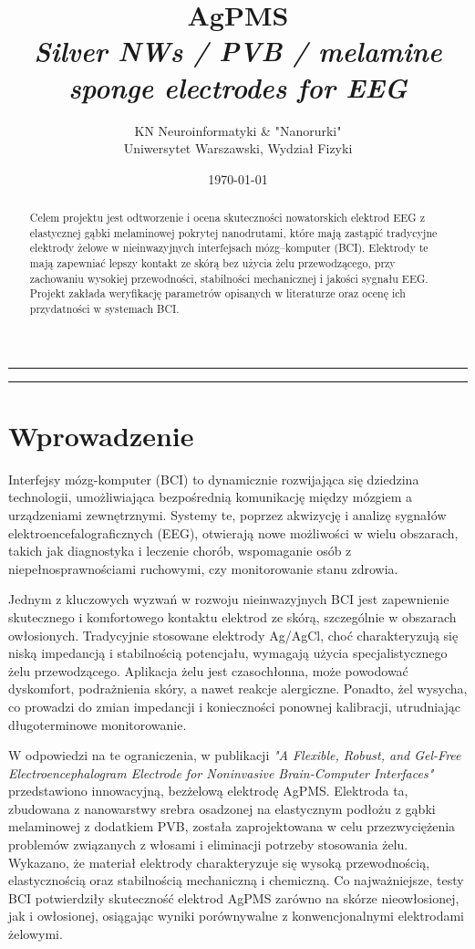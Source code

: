 \documentclass[12pt,a4paper]{article}
\title{\textbf{AgPMS}\\ \large \emph{Silver NWs / PVB / melamine sponge electrodes for EEG}}
\author{KN Neuroinformatyki \& "Nanorurki" \\
\small Uniwersytet Warszawski, Wydział Fizyki}
\date{\today}
\begin{document}
\maketitle
\hrule
\vspace{1em}

\begin{abstract}
    \noindent
    Celem projektu jest odtworzenie i ocena skuteczności nowatorskich elektrod EEG z elastycznej gąbki melaminowej pokrytej nanodrutami, które mają zastąpić tradycyjne elektrody żelowe w nieinwazyjnych interfejsach mózg–komputer (BCI). Elektrody te mają zapewniać lepszy kontakt ze skórą bez użycia żelu przewodzącego, przy zachowaniu wysokiej przewodności, stabilności mechanicznej i jakości sygnału EEG. Projekt zakłada weryfikację parametrów opisanych w literaturze oraz ocenę ich przydatności w systemach BCI.
\end{abstract}

\vspace{1em}
\hrule
\vspace{1em}


\section{Wprowadzenie}
Interfejsy mózg-komputer (BCI) to dynamicznie rozwijająca się dziedzina technologii, umożliwiająca bezpośrednią komunikację między mózgiem a urządzeniami zewnętrznymi. Systemy te, poprzez akwizycję i analizę sygnałów elektroencefalograficznych (EEG), otwierają nowe możliwości w wielu obszarach, takich jak diagnostyka i leczenie chorób, wspomaganie osób z niepełnosprawnościami ruchowymi, czy monitorowanie stanu zdrowia.

Jednym z kluczowych wyzwań w rozwoju nieinwazyjnych BCI jest zapewnienie skutecznego i komfortowego kontaktu elektrod ze skórą, szczególnie w obszarach owłosionych. Tradycyjnie stosowane elektrody Ag/AgCl, choć charakteryzują się niską impedancją i stabilnością potencjału, wymagają użycia specjalistycznego żelu przewodzącego. Aplikacja żelu jest czasochłonna, może powodować dyskomfort, podrażnienia skóry, a nawet reakcje alergiczne. Ponadto, żel wysycha, co prowadzi do zmian impedancji i konieczności ponownej kalibracji, utrudniając długoterminowe monitorowanie.

W odpowiedzi na te ograniczenia, w publikacji \emph{"A Flexible, Robust, and Gel-Free Electroencephalogram Electrode for Noninvasive Brain-Computer Interfaces"} \cite{main} przedstawiono innowacyjną, bezżelową elektrodę AgPMS. Elektroda ta, zbudowana z nanowarstwy srebra osadzonej na elastycznym podłożu z gąbki melaminowej z dodatkiem PVB, została zaprojektowana w celu przezwyciężenia problemów związanych z włosami i eliminacji potrzeby stosowania żelu. Wykazano, że materiał elektrody charakteryzuje się wysoką przewodnością, elastycznością oraz stabilnością mechaniczną i chemiczną. Co najważniejsze, testy BCI potwierdziły skuteczność elektrod AgPMS zarówno na skórze nieowłosionej, jak i owłosionej, osiągając wyniki porównywalne z konwencjonalnymi elektrodami żelowymi.
\end{document}
